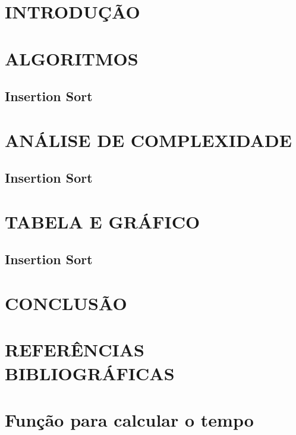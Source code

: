 \documentclass[12pt,arial]{article}
\begin{document}
		\section{INTRODUÇÃO}
		
		\newpage

            \section{ALGORITMOS}
		\subsection{Insertion Sort}
		
		\newpage
  
            \section{ANÁLISE DE COMPLEXIDADE}
		\subsection{Insertion Sort}
		
	    \newpage
	
		\section{TABELA E GRÁFICO}
            \subsection{Insertion Sort}
		
		\newpage
  
		\section{CONCLUSÃO}
		
		\newpage
  
		\section{REFERÊNCIAS BIBLIOGRÁFICAS}
		

		\section{Função para calcular o tempo}
			
\end{document}

